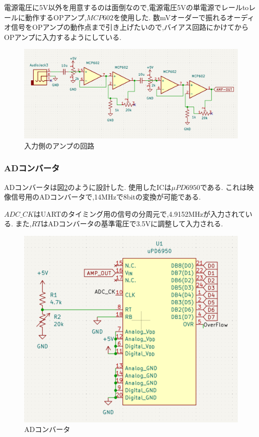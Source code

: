 \documentclass[a4paper,10pt]{article}
\begin{document}
\begin{multicols}{2}[\raggedcolumns]
電源電圧に5V以外を用意するのは面倒なので,電源電圧5Vの単電源でレールtoレールに動作するOPアンプ,$MCP602$を使用した.
数mVオーダーで振れるオーディオ信号をOPアンプの動作点まで引き上げたいので,バイアス回路にかけてからOPアンプに入力するようにしている.

\begin{figure}[H]
    \centering
    \includegraphics[width=1.5\linewidth,angle=270]{figure/in_amp.png} 
    \caption{入力側のアンプの回路} 
    \label{fig:in_amp}
\end{figure}

\subsubsection{ADコンバータ}
ADコンバータは図\ref{fig:adc}のように設計した.
使用したICは$\mu PD6950$である.
これは映像信号用のADコンバータで,14MHzで8bitの変換が可能である.

$ADC\_CK$はUARTのタイミング用の信号の分周元で,4.9152MHzが入力されている.
また,$RT$はADコンバータの基準電圧で3.5Vに調整して入力される.

\begin{figure}[H]
    \centering
    \includegraphics[width=0.9\linewidth]{figure/adc.png} 
    \caption{ADコンバータ} 
    \label{fig:adc}
\end{figure}


\end{multicols}
\end{document}
